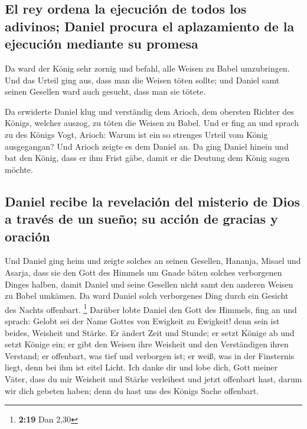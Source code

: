 \hypertarget{el-rey-ordena-la-ejecuciuxf3n-de-todos-los-adivinos-daniel-procura-el-aplazamiento-de-la-ejecuciuxf3n-mediante-su-promesa}{%
\subsection{El rey ordena la ejecución de todos los adivinos; Daniel
procura el aplazamiento de la ejecución mediante su
promesa}\label{el-rey-ordena-la-ejecuciuxf3n-de-todos-los-adivinos-daniel-procura-el-aplazamiento-de-la-ejecuciuxf3n-mediante-su-promesa}}

 Da ward der König sehr zornig und befahl, alle Weisen zu
Babel umzubringen.  Und das Urteil ging aus, dass man die
Weisen töten sollte; und Daniel samt seinen Gesellen ward auch gesucht,
dass man sie tötete.

 Da erwiderte Daniel klug und verständig dem Arioch, dem
obersten Richter des Königs, welcher auszog, zu töten die Weisen zu
Babel.  Und er fing an und sprach zu des Königs Vogt,
Arioch: Warum ist ein so strenges Urteil vom König ausgegangan? Und
Arioch zeigte es dem Daniel an.  Da ging Daniel hinein
und bat den König, dass er ihm Frist gäbe, damit er die Deutung dem
König sagen möchte.

\hypertarget{daniel-recibe-la-revelaciuxf3n-del-misterio-de-dios-a-travuxe9s-de-un-sueuxf1o-su-acciuxf3n-de-gracias-y-oraciuxf3n}{%
\subsection{Daniel recibe la revelación del misterio de Dios a través de
un sueño; su acción de gracias y
oración}\label{daniel-recibe-la-revelaciuxf3n-del-misterio-de-dios-a-travuxe9s-de-un-sueuxf1o-su-acciuxf3n-de-gracias-y-oraciuxf3n}}

 Und Daniel ging heim und zeigte solches an seinen
Gesellen, Hananja, Misael und Asarja,  dass sie den Gott
des Himmels um Gnade bäten solches verborgenen Dinges halben, damit
Daniel und seine Gesellen nicht samt den anderen Weisen zu Babel
umkämen.  Da ward Daniel solch verborgenes Ding durch ein
Gesicht des Nachts offenbart. \footnote{\textbf{2:19} Dan 2,30}
 Darüber lobte Daniel den Gott des Himmels, fing an und
sprach: Gelobt sei der Name Gottes von Ewigkeit zu Ewigkeit! denn sein
ist beides, Weisheit und Stärke.  Er ändert Zeit und
Stunde; er setzt Könige ab und setzt Könige ein; er gibt den Weisen ihre
Weisheit und den Verständigen ihren Verstand;  er
offenbart, was tief und verborgen ist; er weiß, was in der Finsternis
liegt, denn bei ihm ist eitel Licht.  Ich danke dir und
lobe dich, Gott meiner Väter, dass du mir Weisheit und Stärke verleihest
und jetzt offenbart hast, darum wir dich gebeten haben; denn du hast uns
des Königs Sache offenbart.

